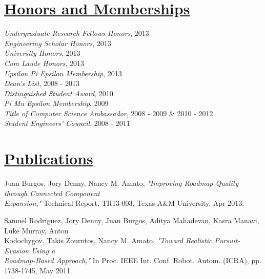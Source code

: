 \documentclass[8pt]{res}
\begin{document}
\begin{resume}

    \section{\underline{Honors and Memberships}}          
    \vspace{+0.02in}	
    \emph{Undergraduate Research Fellows Honors}, 2013 \\
    \emph{Engineering Scholar Honors}, 2013 \\
    \emph{University Honors}, 2013 \\
    \emph{Cum Laude Honors}, 2013 \\
    \emph{Upsilon Pi Epsilon Membership}, 2013 \\
    \emph{Dean's List}, 2008 - 2013 \\
    \emph{Distinguished Student Award}, 2010 \\
    \emph{Pi Mu Epsilon Membership}, 2009 \\
    \emph{Title of Computer Science Ambassador}, 2008 - 2009 \& 2010 - 2012 \\
    \emph{Student Engineers' Council}, 2008 - 2011 \\
    \vspace{-0.1in}	


    \section{\underline{Publications}}
    Juan Burgos, Jory Denny, Nancy M. Amato, \emph{"Improving Roadmap Quality through Connected Component \\
    Expansion,"} Technical Report, TR13-003, Texas A\&M University, Apr 2013.

    Samuel Rodriguez, Jory Denny, Juan Burgos, Aditya Mahadevan, Kasra Manavi, Luke Murray, Anton \\
    Kodochygov, Takis Zourntos, Nancy M. Amato, \emph{"Toward Realistic Pursuit-Evasion Using a \\
    Roadmap-Based Approach,"} In Proc. IEEE Int. Conf. Robot. Autom. (ICRA), pp. 1738-1745, May 2011. 


\end{resume}
\end{document}
